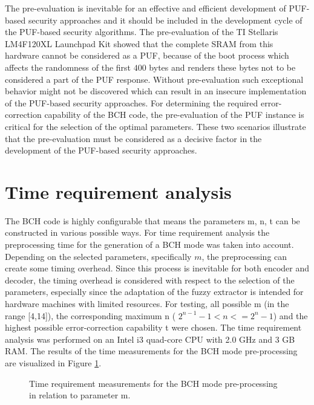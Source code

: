 The pre-evaluation is inevitable for an effective and efficient development of PUF-based security approaches and it should be included in the development cycle of the PUF-based security algorithms. The pre-evaluation of the TI Stellaris LM4F120XL Launchpad Kit showed that the complete SRAM from this hardware cannot be considered as a PUF, because of the boot process which affects the randomness of the first  $400$ bytes and renders these bytes not to be considered a part of the PUF response.
Without pre-evaluation such exceptional behavior might not be discovered which can result in an insecure implementation of the PUF-based security approaches. For determining the required error-correction capability of the BCH code, the pre-evaluation of the PUF instance is critical for the selection of the optimal parameters. These two scenarios illustrate that the pre-evaluation must be considered as a decisive factor in the development of the PUF-based security approaches.


\section{Time requirement analysis}

The BCH code is highly configurable that means the parameters m, n, t can be constructed in various possible ways. For time requirement analysis the preprocessing time for the generation of a BCH mode was taken into account. Depending on the selected parameters, specifically $m$, the preprocessing can create some timing overhead. Since this process is inevitable for both encoder and decoder, the timing overhead is considered with respect to the selection of the parameters, especially since
the adaptation of the fuzzy extractor is intended for hardware machines with limited resources. For testing, all possible m (in the range [4,14]), the corresponding maximum n ( $2^{n-1} - 1 < n <= 2^{n} - 1$) and the highest possible error-correction capability t were chosen. The time requirement analysis was performed on an Intel i3 quad-core CPU with 2.0 GHz and 3 GB RAM. The results of the time measurements for the BCH mode pre-processing are visualized in Figure \ref{img:bch_time}.
\begin{figure}[h]
\centering
{}
\caption{Time requirement measurements for the BCH mode pre-processing in relation to parameter m.}
\label{img:bch_time}
\end{figure}

